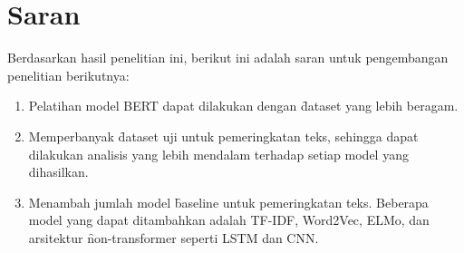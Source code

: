 \section{Saran}
\label{sec:saran}
Berdasarkan hasil penelitian ini, berikut ini adalah saran untuk pengembangan penelitian berikutnya:
\begin{enumerate}
	\item Pelatihan model BERT dapat dilakukan dengan \f{dataset} yang lebih beragam. 
	\item Memperbanyak \f{dataset} uji untuk pemeringkatan teks, sehingga dapat dilakukan analisis yang lebih mendalam terhadap setiap model yang dihasilkan.
	\item Menambah jumlah model \f{baseline} untuk pemeringkatan teks. Beberapa model yang dapat ditambahkan adalah TF-IDF, Word2Vec, ELMo, dan arsitektur \f{non-transformer} seperti LSTM dan CNN.
\end{enumerate}

